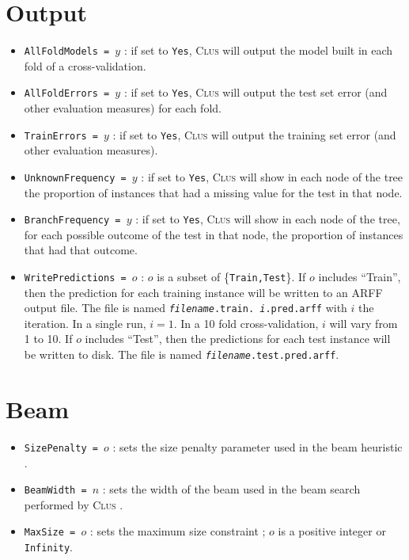 \documentclass[a4paper]{report}
\newcommand{\clus}{\textsc{Clus}}
\begin{document}
\section{Output}

\begin{itemize}
\item {\tt AllFoldModels = $y$} : if set to {\tt Yes}, \clus{} will output the model built in each fold of a cross-validation.
\item {\tt AllFoldErrors = $y$} : if set to {\tt Yes}, \clus{} will output the test set error (and other evaluation measures) for each fold.
\item {\tt TrainErrors = $y$} : if set to {\tt Yes}, \clus{} will output the training set error (and other evaluation measures).
\item {\tt UnknownFrequency = $y$} : if set to {\tt Yes}, \clus{} will show in each node of the tree the proportion of instances that had a missing value for the test in that node.
\item {\tt BranchFrequency = $y$} : if set to {\tt Yes}, \clus{} will show in each node of the tree, for each possible outcome of the test in that node, the proportion of instances that had that outcome.
\item {\tt WritePredictions = $o$} : $o$ is a subset of \{\texttt{Train,Test}\}. If $o$ includes ``Train'', then the prediction for each training instance will be written to an ARFF output file. The file is named {\tt {\em filename}.train. {\em i}.pred.arff} with $i$ the iteration. In a single run, $i = 1$. In a 10 fold cross-validation, $i$ will vary from 1 to 10. If $o$ includes ``Test'', then the predictions for each test instance will be written to disk. The file is named {\tt {\em filename}.test.pred.arff}.
\end{itemize}

\section{Beam}

\begin{itemize}
\item {\tt SizePenalty = $o$} : sets the size penalty parameter used in the beam heuristic \cite{Kocev07a:proc}.
\item {\tt BeamWidth = $n$} : sets the width of the beam used in the beam search performed by \clus{} \cite{Kocev07a:proc}.
\item {\tt MaxSize = $o$} : sets the maximum size constraint \cite{Kocev07a:proc}; $o$ is a positive integer or {\tt Infinity}.
\end{itemize}
\end{document}
